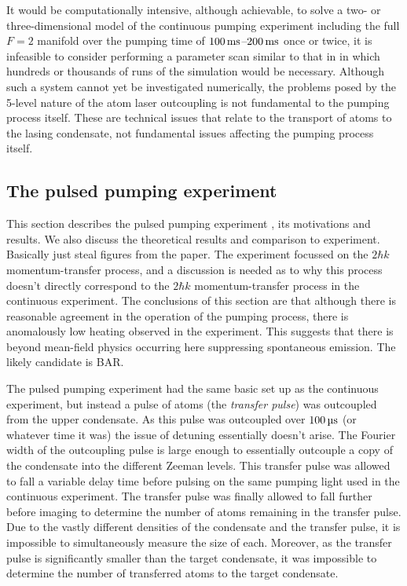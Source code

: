 It would be computationally intensive, although achievable, to solve a two- or three-dimensional model of the continuous pumping experiment including the full $F=2$ manifold over the pumping time of $\unit[100]{ms}$--$\unit[200]{ms}$ once or twice, it is infeasible to consider performing a parameter scan similar to that in  in which hundreds or thousands of runs of the simulation would be necessary.  Although such a system cannot yet be investigated numerically, the problems posed by the 5-level nature of the atom laser outcoupling is not fundamental to the pumping process itself.  These are technical issues that relate to the transport of atoms to the lasing condensate, not fundamental issues affecting the pumping process itself.


\subsection{The pulsed pumping experiment}
\label{OpticalPumping:PulsedPumpingExperiment}

This section describes the pulsed pumping experiment \citep{Doring:2009}, its motivations and results.  We also discuss the theoretical results and comparison to experiment.  Basically just steal figures from the paper.  The experiment focussed on the $2 \hbar k$ momentum-transfer process, and a discussion is needed as to why this process doesn't directly correspond to the $2 \hbar k$ momentum-transfer process in the continuous experiment.  The conclusions of this section are that although there is reasonable agreement in the operation of the pumping process, there is anomalously low heating observed in the experiment.  This suggests that there is beyond mean-field physics occurring here suppressing spontaneous emission.  The likely candidate is BAR.

\parasep

The pulsed pumping experiment had the same basic set up as the continuous experiment, but instead a pulse of atoms (the \emph{transfer pulse}) was outcoupled from the upper condensate.  As this pulse was outcoupled over $\unit[100]{\micro s}$ (or whatever time it was) the issue of detuning essentially doesn't arise.  The Fourier width of the outcoupling pulse is large enough to essentially outcouple a copy of the condensate into the different Zeeman levels.  This transfer pulse was allowed to fall a variable delay time before pulsing on the same pumping light used in the continuous experiment.  The transfer pulse was finally allowed to fall further before imaging to determine the number of atoms remaining in the transfer pulse.  Due to the vastly different densities of the condensate and the transfer pulse, it is impossible to simultaneously measure the size of each.  Moreover, as the transfer pulse is significantly smaller than the target condensate, it was impossible to determine the number of transferred atoms to the target condensate.

